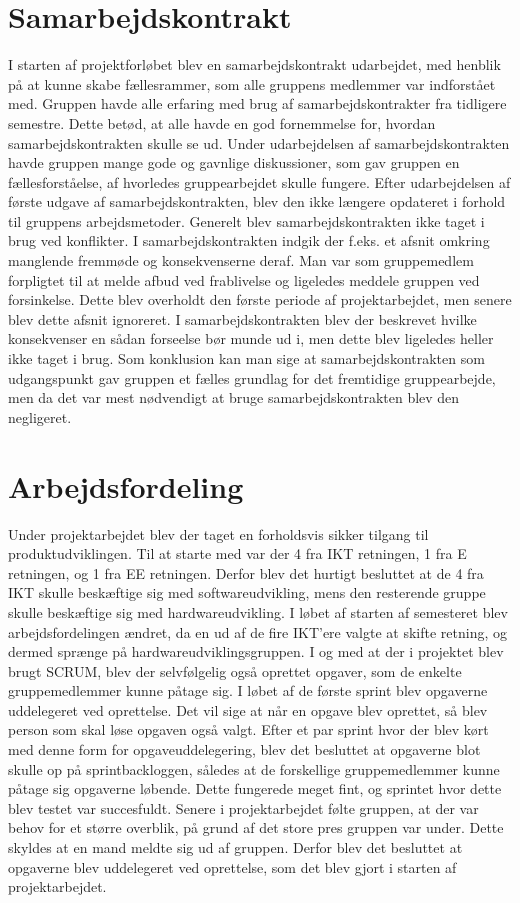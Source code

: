 \section{Samarbejdskontrakt}
I starten af projektforløbet blev en samarbejdskontrakt udarbejdet, med henblik på at kunne skabe fællesrammer, som alle gruppens medlemmer var indforstået med.
Gruppen havde alle erfaring med brug af samarbejdskontrakter fra tidligere semestre. Dette betød, at alle havde en god fornemmelse for, hvordan 
samarbejdskontrakten skulle se ud. Under udarbejdelsen af samarbejdskontrakten havde gruppen mange gode og gavnlige diskussioner, som gav gruppen en 
fællesforståelse, af hvorledes gruppearbejdet skulle fungere. 
Efter udarbejdelsen af første udgave af samarbejdskontrakten, blev den ikke længere opdateret i forhold til gruppens arbejdsmetoder. Generelt blev 
samarbejdskontrakten ikke taget i brug ved konflikter. I samarbejdskontrakten indgik der f.eks. et afsnit omkring manglende fremmøde og konsekvenserne deraf. 
Man var som gruppemedlem forpligtet til at melde afbud ved frablivelse og ligeledes meddele gruppen ved forsinkelse. Dette blev overholdt den første periode 
af projektarbejdet, men senere blev dette afsnit ignoreret. I samarbejdskontrakten blev der beskrevet hvilke konsekvenser en sådan forseelse bør munde ud i, 
men dette blev ligeledes heller ikke taget i brug. 
Som konklusion kan man sige at samarbejdskontrakten som udgangspunkt gav gruppen et fælles grundlag for det fremtidige gruppearbejde, men da det var mest
 nødvendigt at bruge samarbejdskontrakten blev den negligeret.
 
 \section{Arbejdsfordeling}
Under projektarbejdet blev der taget en forholdsvis sikker tilgang til produktudviklingen. Til at starte med var der 4 fra IKT retningen, 1 fra E retningen, og 
1 fra EE retningen. Derfor blev det hurtigt besluttet at de 4 fra IKT skulle beskæftige sig med softwareudvikling, mens den resterende gruppe skulle beskæftige 
sig med hardwareudvikling. I løbet af starten af semesteret blev arbejdsfordelingen ændret, da en ud af de fire IKT’ere valgte at skifte retning, og dermed 
sprænge på hardwareudviklingsgruppen. 
I og med at der i projektet blev brugt SCRUM, blev der selvfølgelig også oprettet opgaver, som de enkelte gruppemedlemmer kunne påtage sig. I løbet af de første 
sprint blev opgaverne uddelegeret ved oprettelse. Det vil sige at når en opgave blev oprettet, så blev person som skal løse opgaven også valgt. Efter et par 
sprint hvor der blev kørt med denne form for opgaveuddelegering, blev det besluttet at opgaverne blot skulle op på sprintbackloggen, således at de forskellige 
gruppemedlemmer kunne påtage sig opgaverne løbende. Dette fungerede meget fint, og sprintet hvor dette blev testet var succesfuldt. Senere i projektarbejdet 
følte gruppen, at der var behov for et større overblik, på grund af det store pres gruppen var under. Dette skyldes at en mand meldte sig ud af gruppen. Derfor 
blev det besluttet at opgaverne blev uddelegeret ved oprettelse, som det blev gjort i starten af projektarbejdet.


